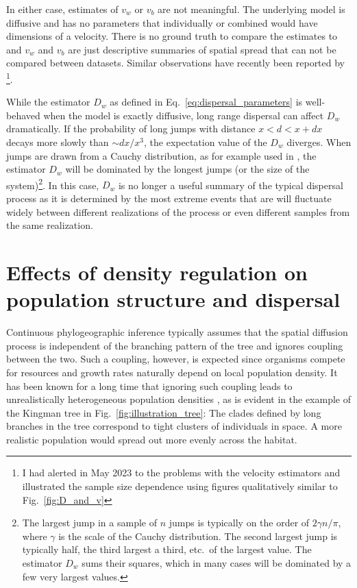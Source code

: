 \documentclass[aps,rmp, twocolumn]{revtex4}
\begin{document}
In either case, estimates of $v_w$ or $v_b$ are not meaningful.
The underlying model is diffusive and has no parameters that individually or combined would have dimensions of a velocity.
There is no ground truth to compare the estimates to and $v_w$ and $v_b$ are just descriptive summaries of spatial spread that can not be compared between datasets.
Similar observations have recently been reported by \citet{dellicour_how_2024}\footnote{I had alerted \citet{dellicour_how_2024} in May 2023 to the problems with the velocity estimators and illustrated the sample size dependence using figures qualitatively similar to Fig.~\ref{fig:D_and_v}}.

While the estimator $D_w$ as defined in Eq.~\ref{eq:dispersal_parameters} is well-behaved when the model is exactly diffusive, long range dispersal can affect $D_w$ dramatically.
If the probability of long jumps with distance $x<d<x+dx$ decays more slowly than $\sim dx/x^3$, the expectation value of the $D_w$ diverges.
When jumps are drawn from a Cauchy distribution, as for example used in \citet{dellicour_how_2024}, the estimator $D_w$ will be dominated by the longest jumps (or the size of the system)\footnote{The largest jump in a sample of $n$ jumps is typically on the order of $2\gamma n/\pi$, where $\gamma$ is the scale of the Cauchy distribution. The second largest jump is typically half, the third largest a third, etc.~of the largest value. The estimator $D_w$ sums their squares, which in many cases will be dominated by a few very largest values. }.
In this case, $D_w$ is no longer a useful summary of the typical dispersal process as it is determined by the most extreme events that are will fluctuate widely between different realizations of the process or even different samples from the same realization.


\section*{Effects of density regulation on population structure and dispersal}
Continuous phylogeographic inference typically assumes that the spatial diffusion process is independent of the branching pattern of the tree and ignores coupling between the two.
Such a coupling, however, is expected since organisms compete for resources and growth rates naturally depend on local population density.
It has been known for a long time that ignoring such coupling leads to unrealistically heterogeneous population densities \citep{felsenstein_pain_1975}, as is evident in the example of the Kingman tree in Fig.~\ref{fig:illustration_tree}:
The clades defined by long branches in the tree correspond to tight clusters of individuals in space.
A more realistic population would spread out more evenly across the habitat.
\end{document}
